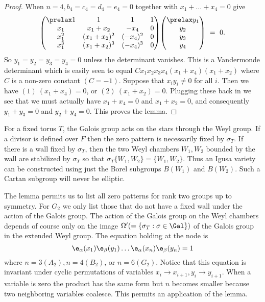 \documentclass{memo-l}
\theoremstyle{definition}
\theoremstyle{remark}
\numberwithin{section}{chapter}
\numberwithin{equation}{chapter}
\begin{document}
\begin{proof}
When $n = 4, b_{4} = c_{4} = d_{4} = e_{4} = 0$ together with $x_{1}+\ldots +x_{4} = 0$
give
$$
{\begin{pmatrix} \prelax
1 & 1 & 1 & 1\\ x_{1} & x_1 + x_2 & -x_4 & 0 \\
x_{1}^2 & (x_1+x_2)^2 & (-x_4)^2 & 0 \\ x_1^3 & (x_1+x_2)^3 & (-x_4)^3 & 0
\end{pmatrix}} {\begin{pmatrix} \prelax  y_1 \\ y_2 \\ y_3 \\ y_4 \end{pmatrix}}\ =\ 0 .
$$
So $y_{1} = y_{2} = y_{3} = y_{4} = 0$ unless the determinant vanishes.
 This is a Vandermonde determinant which is easily seen to equal
$Cx_{1}x_{2}x_{3}x_{4}(x_{1}+x_{4})(x_{1}+x_{2})$ where $C$ is a non-zero
constant $(C = -1)$.
 Suppose that $x_{i}y_{i}\ne 0$ for all $i$.
 Then we have $(1)\ (x_{1}+x_{4})=0$, or $(2)\ (x_{1}+x_{2}) = 0$.
 Plugging these back in we see that we must actually have $x_{1}+x_{4} = 0$ and
$x_{1}+x_{2} = 0$, and consequently $y_{1}+y_{3} = 0$ and $y_{2}+y_{4} = 0$.
 This proves the lemma.
 \end{proof}

   For a fixed torus $T$, the Galois group acts on the stars through the
Weyl group.
 If a divisor is defined over $F$ then the zero pattern is necessarily fixed
by ${\sigma}_{T}$.
 If there is a wall fixed by ${\sigma}_{T}$, then the two Weyl chambers
$W_{1}, W_{2}$ bounded by the wall are stabilized by ${\sigma}_{T}$ so that
${\sigma}_{T}\{W_{1}, W_{2}\} = \{W_{1},W_{2}\}$.
 Thus an Igusa variety can be constructed using just the Borel subgroups  $B(W_{1})$
and $B(W_{2})$.  Such a Cartan subgroup will never be elliptic.

   The lemma permits us to list all zero patterns for rank two groups up
to symmetry.
 For $G_{2}$ we only list those that do not have a fixed wall under the
action of the Galois group.
 The action of the Galois group on the Weyl chambers depends of course
only on the image ${\Omega}'(= \{{\sigma}_{T}:{\sigma} \in \Gal\})$
of the Galois group in the extended Weyl group.
The equation holding at the node is
$$
{\e}_{\alpha}(x_{1}){\e}_{\beta}(y_{1})\ldots
{\e}_{\alpha}(x_n)\e_\beta(y_n) = 1
$$
where $n = 3 (A_{2}), n = 4 (B_{2})$, or $n = 6 (G_{2})$.
 Notice that this equation is invariant under cyclic permutations of variables
$x_{i} {\to} x_{i+1}, y_{i} {\to} y_{i+1}$.
 When a variable is zero the product has the same form but $n$ becomes
smaller because two neighboring variables coalesce.
 This permits an application of the lemma.
\end{document}
